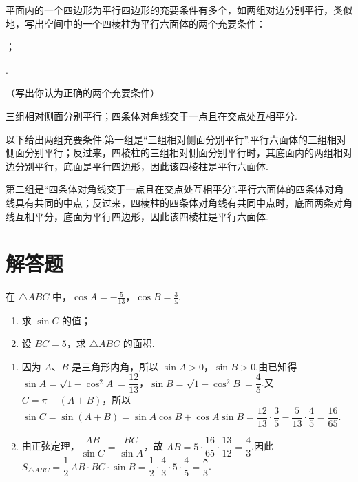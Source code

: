 \begin{problem}
平面内的一个四边形为平行四边形的充要条件有多个，如两组对边分别平行，类似地，写出空间中的一个四棱柱为平行六面体的两个充要条件：

\begin{circlelist}
    \item\fillinblank{}；
    \item\fillinblank{}.
\end{circlelist}

（写出你认为正确的两个充要条件）
\end{problem}

\begin{answer}
三组相对侧面分别平行；四条体对角线交于一点且在交点处互相平分.
\end{answer}

\begin{solution}
以下给出两组充要条件.第一组是“三组相对侧面分别平行”.平行六面体的三组相对侧面分别平行；反过来，四棱柱的三组相对侧面分别平行时，其底面内的两组相对边分别平行，底面是平行四边形，因此该四棱柱是平行六面体.

第二组是“四条体对角线交于一点且在交点处互相平分”.平行六面体的四条体对角线具有共同的中点；反过来，四棱柱的四条体对角线有共同中点时，底面两条对角线互相平分，底面为平行四边形，因此该四棱柱是平行六面体.
\end{solution}

\section{解答题}

\begin{problem}
在 \(\triangle ABC\) 中，\(\cos A = -\frac{5}{13}\)，\(\cos B = \frac{3}{5}\).

\begin{enumerate}
\item 求 \(\sin C\) 的值；
\item 设 \(BC = 5\)，求 \(\triangle ABC\) 的面积.
\end{enumerate}
\end{problem}

\begin{solution}
\begin{enumerate}
\item 因为 \(A\)、\(B\) 是三角形内角，所以 \(\sin A>0\)，\(\sin B>0\).由已知得 \(\sin A=\sqrt{1-\cos^2A}=\dfrac{12}{13}\)，\(\sin B=\sqrt{1-\cos^2B}=\dfrac45\).又 \(C=\pi-(A+B)\)，所以
\(\sin C=\sin(A+B)=\sin A\cos B+\cos A\sin B=\dfrac{12}{13}\cdot\dfrac35-\dfrac5{13}\cdot\dfrac45=\dfrac{16}{65}\).
\item 由正弦定理，\(\dfrac{AB}{\sin C}=\dfrac{BC}{\sin A}\)，故 \(AB=5\cdot\dfrac{16}{65}\cdot\dfrac{13}{12}=\dfrac43\).因此
\(S_{\triangle ABC}=\dfrac12\,AB\cdot BC\cdot\sin B=\dfrac12\cdot\dfrac43\cdot5\cdot\dfrac45=\dfrac83\).
\end{enumerate}
\end{solution}

